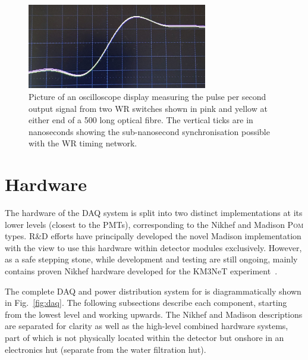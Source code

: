 \begin{figure} %
    \includegraphics[width=0.7\textwidth]{diagrams/5-daq/sync.pdf}
    \caption[Picture of White Rabbit timing synchronisation seen within \chipsfive]
    {Picture of an oscilloscope display measuring the pulse per second output signal from two WR
        switches shown in pink and yellow at either end of a \unit{500}{} long optical
        fibre. The vertical ticks are in nanoseconds showing the sub-nanosecond synchronisation
        possible with the WR timing network.}
    \label{fig:sync}
\end{figure}

\section{Hardware} %
\label{sec:daq_hard} %

The hardware of the \chipsfive DAQ system is split into two distinct implementations at its lower
levels (closest to the PMTs), corresponding to the Nikhef and Madison \textsc{Pom} types. \chips
R\&D efforts have principally developed the novel Madison implementation with the view to use this
hardware within detector modules exclusively. However, as a safe stepping stone, while development
and testing are still ongoing, \chipsfive mainly contains proven Nikhef hardware developed for the
KM3NeT experiment~\cite{adrian2016}.

The complete DAQ and power distribution system for \chipsfive is diagrammatically shown in
Fig.~\ref{fig:daq}. The following subsections describe each component, starting from the lowest
level and working upwards. The Nikhef and Madison descriptions are separated for clarity as well
as the high-level combined hardware systems, part of which is not physically located within the
detector but onshore in an electronics hut (separate from the water filtration hut).

